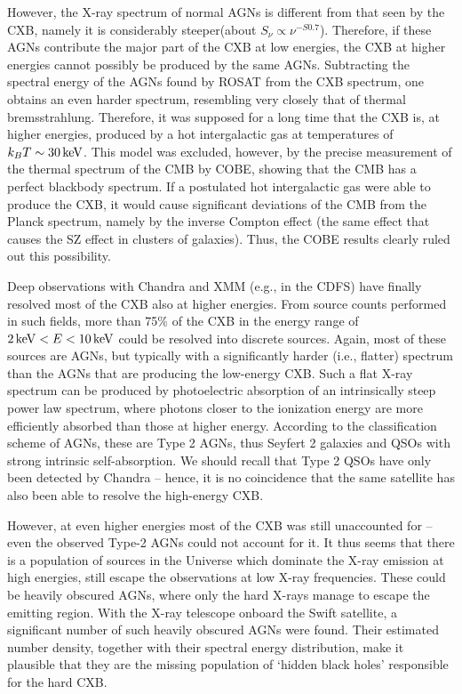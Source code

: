 \documentclass[a4paper,11pt]{article}
\begin{document}
{\noindent}However, the X-ray spectrum of normal AGNs is different from that seen by the CXB, namely it is considerably steeper(about $S_\nu\propto\nu^{-S0.7}$). Therefore, if these AGNs contribute the major part of the CXB at low energies, the CXB at higher energies cannot possibly be produced by the same AGNs. Subtracting the spectral energy of the AGNs found by ROSAT from the CXB spectrum, one obtains an even harder spectrum, resembling very closely that of thermal bremsstrahlung. Therefore, it was supposed for a long time that the CXB is, at higher energies, produced by a hot intergalactic gas at temperatures of $k_BT\sim30\,{\rm keV}$. This model was excluded, however, by the precise measurement of the thermal spectrum of the CMB by COBE, showing that the CMB has a perfect blackbody spectrum. If a postulated hot intergalactic gas were able to produce the CXB, it would cause significant deviations of the CMB from the Planck spectrum, namely by the inverse Compton effect (the same effect that causes the SZ effect in clusters of galaxies). Thus, the COBE results clearly ruled out this possibility.

{\noindent}Deep observations with Chandra and XMM (e.g., in the CDFS) have finally resolved most of the CXB also at higher energies. From source counts performed in such fields, more than 75\% of the CXB in the energy range of $2\,{\rm keV}<E<10\,{\rm keV}$ could be resolved into discrete sources. Again, most of these sources are AGNs, but typically with a significantly harder (i.e., flatter) spectrum than the AGNs that are producing the low-energy CXB. Such a flat X-ray spectrum can be produced by photoelectric absorption of an intrinsically steep power law spectrum, where photons closer to the ionization energy are more efficiently absorbed than those at higher energy. According to the classification scheme of AGNs, these are Type 2 AGNs, thus Seyfert 2 galaxies and QSOs with strong intrinsic self-absorption. We should recall that Type 2 QSOs have only been detected by Chandra -- hence, it is no coincidence that the same satellite has also been able to resolve the high-energy CXB.

{\noindent}However, at even higher energies most of the CXB was still unaccounted for -- even the observed Type-2 AGNs could not account for it. It thus seems that there is a population of sources in the Universe which dominate the X-ray emission at high energies, still escape the observations at low X-ray frequencies. These could be heavily obscured AGNs, where only the hard X-rays manage to escape the emitting region. With the X-ray telescope onboard the Swift satellite, a significant number of such heavily obscured AGNs were found. Their estimated number density, together with their spectral energy distribution, make it plausible that they are the missing population of `hidden black holes' responsible for the hard CXB.
\end{document}
